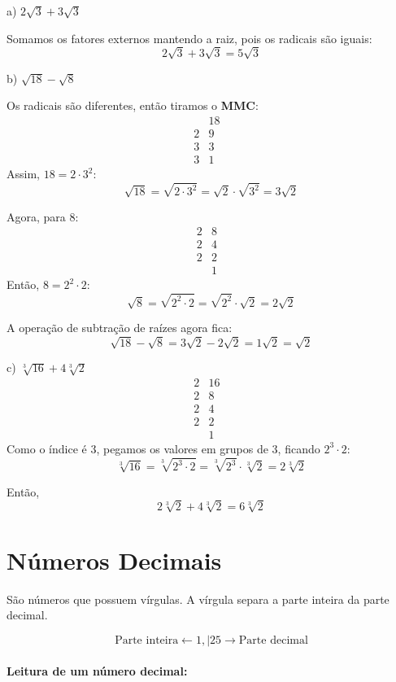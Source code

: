 \documentclass[letterpaper]{book}
\begin{document}
a) \(2\sqrt{3} + 3\sqrt{3}\)

Somamos os fatores externos mantendo a raiz, pois os radicais são iguais:
\[2\sqrt{3} + 3\sqrt{3} = 5\sqrt{3}\]

b) \(\sqrt{18} - \sqrt{8}\)

Os radicais são diferentes, então tiramos o \textbf{MMC}:
\[
\begin{array}{c|ccc}
  & 18 &\\
\hline
2 & 9 &\\
3 & 3 &\\
3 & 1
\end{array}
\]
Assim, \(18 = 2 \cdot 3^{2}\):
\[\sqrt{18} = \sqrt{2 \cdot 3^{2}} = \sqrt{2} \cdot \sqrt{3^{2}} = 3\sqrt{2}\]

Agora, para \(8\):
\[
\begin{array}{c|ccc}
 2 & 8 &\\
\hline
2 & 4 &\\
2 & 2 &\\
 & 1
\end{array}
\]
Então, \(8 = 2^{2} \cdot 2\):
\[\sqrt{8} = \sqrt{2^{2} \cdot 2} = \sqrt{2^{2}} \cdot \sqrt{2} = 2\sqrt{2}\]

A operação de subtração de raízes agora fica:
\[\sqrt{18} - \sqrt{8} = 3\sqrt{2} - 2\sqrt{2} = 1\sqrt{2} = \sqrt{2}\]

c) \(\sqrt[3]{16} + 4\sqrt[3]{2}\)
\[
\begin{array}{c|ccc}
 2 & 16 &\\
\hline
2 & 8 &\\
2 & 4 &\\
2 & 2 \\
  & 1
\end{array}
\]
Como o índice é 3, pegamos os valores em grupos de 3, ficando \(2^{3} \cdot 2\):
\[\sqrt[3]{16} = \sqrt[3]{2^{3} \cdot 2} = \sqrt[3]{2^{3}} \cdot \sqrt[3]{2} = 2\sqrt[3]{2}\]

Então,
\[2\sqrt[3]{2} + 4\sqrt[3]{2} = 6\sqrt[3]{2}\]

\section{Números Decimais}

São números que possuem vírgulas. A vírgula separa a parte inteira da parte decimal.

\[\text{Parte inteira} \leftarrow 1,|25 \rightarrow \text{Parte decimal}\]

\paragraph{Leitura de um número decimal:}
\par
\end{document}
